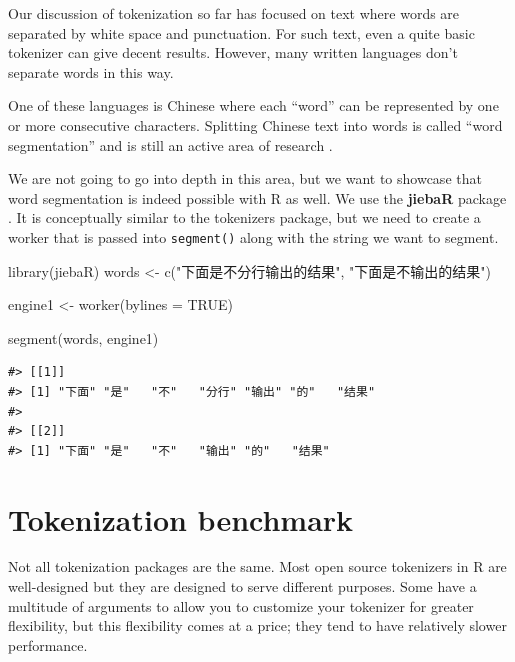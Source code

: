 \documentclass[
]{krantz}
\makeatletter
\newenvironment{Shaded}{\begin{snugshade}}{\end{snugshade}}
\newcommand{\AttributeTok}[1]{\textcolor[rgb]{0.77,0.63,0.00}{#1}}
\newcommand{\ConstantTok}[1]{\textcolor[rgb]{0.00,0.00,0.00}{#1}}
\newcommand{\FunctionTok}[1]{\textcolor[rgb]{0.00,0.00,0.00}{#1}}
\newcommand{\NormalTok}[1]{#1}
\newcommand{\OtherTok}[1]{\textcolor[rgb]{0.56,0.35,0.01}{#1}}
\newcommand{\StringTok}[1]{\textcolor[rgb]{0.31,0.60,0.02}{#1}}
\newenvironment{kframe}{%
\medskip{}
\setlength{\fboxsep}{.8em}
 \def\at@end@of@kframe{}%
 \ifinner\ifhmode%
  \def\at@end@of@kframe{\end{minipage}}%
  \begin{minipage}{\columnwidth}%
 \fi\fi%
 \def\FrameCommand##1{\hskip\@totalleftmargin \hskip-\fboxsep
 \colorbox{shadecolor}{##1}\hskip-\fboxsep
     \hskip-\linewidth \hskip-\@totalleftmargin \hskip\columnwidth}%
 \MakeFramed {\advance\hsize-\width
   \@totalleftmargin\z@ \linewidth\hsize
   \@setminipage}}%
 {\par\unskip\endMakeFramed%
 \at@end@of@kframe}
\renewenvironment{Shaded}{\begin{kframe}}{\end{kframe}}
\makeatother
\begin{document}
Our discussion of tokenization so far has focused on text where words are separated by white space and punctuation. For such text, even a quite basic tokenizer can give decent results. However, many written languages don't separate words in this way.

One of these languages is Chinese where each ``word'' can be represented by one or more consecutive characters.
Splitting Chinese text into words is called ``word segmentation'' and is still an active area of research \citep{ma-etal-2018-state, Huang2019}.

We are not going to go into depth in this area, but we want to showcase that word segmentation is indeed possible with R as well. We use the \textbf{jiebaR} package \citep{R-jiebaR}. It is conceptually similar to the tokenizers package, but we need to create a worker that is passed into \texttt{segment()} along with the string we want to segment.

\begin{Shaded}
\begin{Highlighting}[]
\FunctionTok{library}\NormalTok{(jiebaR)}
\NormalTok{words }\OtherTok{\textless{}{-}} \FunctionTok{c}\NormalTok{(}\StringTok{"下面是不分行输出的结果"}\NormalTok{, }\StringTok{"下面是不输出的结果"}\NormalTok{)}

\NormalTok{engine1 }\OtherTok{\textless{}{-}} \FunctionTok{worker}\NormalTok{(}\AttributeTok{bylines =} \ConstantTok{TRUE}\NormalTok{)}

\FunctionTok{segment}\NormalTok{(words, engine1)}
\end{Highlighting}
\end{Shaded}

\begin{verbatim}
#> [[1]]
#> [1] "下面" "是"   "不"   "分行" "输出" "的"   "结果"
#> 
#> [[2]]
#> [1] "下面" "是"   "不"   "输出" "的"   "结果"
\end{verbatim}

\hypertarget{tokenization-benchmark}{%
\section{Tokenization benchmark}\label{tokenization-benchmark}}

Not all tokenization packages are the same. Most open source tokenizers in R are well-designed but they are designed to serve different purposes. Some have a multitude of arguments to allow you to customize your tokenizer for greater flexibility, but this flexibility comes at a price; they tend to have relatively slower performance.
\end{document}
